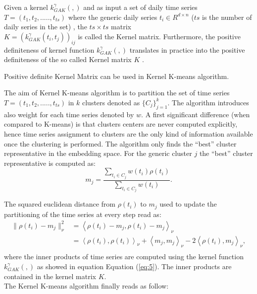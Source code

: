 \documentclass[11pt]{article}
\begin{document}
Given a kernel \(k_{GAK}^{\gamma}(,)\) and as input a set of daily time
series \(T=(t_1,t_2,.....,t_{ts})\) where the generic daily series
\(t_i \in R^{d \times n }\) (\(ts\) is the number of daily series in the
set) , the \(ts \times ts\) matrix\\
\(K= (k_{GAK}^{\gamma}(t_i , t_j))_{ij}\) is called the Kernel matrix.
Furthermore, the positive definiteness of kernel function
\(k_{GAK}^{\gamma}(,)\) translates in practice into the positive
definiteness of the so called Kernel matrix \(K\)
\cite{cuturi2009positive}.

Positive definite Kernel Matrix can be used in Kernel K-means algorithm.

The aim of Kernel K-means algorithm is to partition the set of time
series \(T=(t_1,t_2,.....,t_{ts})\) in \(k\) clusters denoted as
\(\{C_j \}_{j=1}^k\). The algorithm introduces also weight for each time
series denoted by \(w\). A first significant difference (when compared
to K-means) is that clusters centers are never computed explicitly,
hence time series assignment to clusters are the only kind of
information available once the clustering is performed. The algorithm
only finds the ``best'' cluster representative in the embedding space.
For the generic cluster \(j\) the ``best'' cluster representative is
computed as: \begin{equation}
\label{eq:10}
m_j=\frac{\sum_{t_i \in C_j}w(t_i)\rho(t_i)}{\sum_{t_i \in C_j}w(t_i)}.
\end{equation}

The squared euclidean distance from \(\rho(t_i)\) to \(m_j\) used to
update the partitioning of the time series at every step read as:
\begin{equation}
\label{eq:11}
\begin{split}\| \rho(t_i) - m_j\|_\mathcal{\nu}^2
    &= \left\langle \rho(t_i) - m_j,
                    \rho(t_i) - m_j
       \right\rangle_{\mathcal{\nu}} \\
    &= \left\langle \rho(t_i), \rho(t_i)
       \right\rangle_{\mathcal{\nu}}  +
       \left\langle m_j,m_j
       \right\rangle_{\mathcal{\nu}}  - 2
       \left\langle \rho(t_i), m_j
       \right\rangle_{\mathcal{\nu}}, \\
\end{split}    
\end{equation} where the inner products of time series are computed
using the kernel function \(k_{GAK}^{\gamma}(,)\) as showed in equation
Equation (\ref{eq:5}). The inner products are contained in the kernel
matrix \(K\). \[
\] The Kernel K-means algorithm finally reads as follow:
\end{document}
